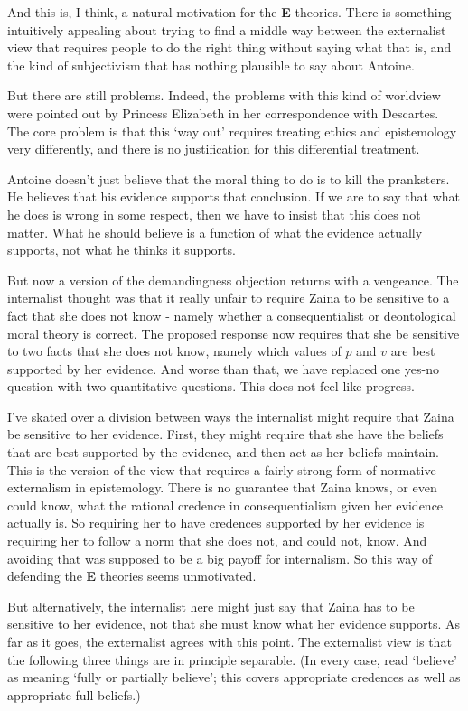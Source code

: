 And this is, I think, a natural motivation for the \textbf{E} theories. There is something intuitively appealing about trying to find a middle way between the externalist view that requires people to do the right thing without saying what that is, and the kind of subjectivism that has nothing plausible to say about \gls{Antoine}.

But there are still problems. Indeed, the problems with this kind of worldview were pointed out by Princess Elizabeth in her correspondence with Descartes. The core problem is that this `way out' requires treating ethics and epistemology very differently, and there is no justification for this differential treatment.

\gls{Antoine} doesn't just believe that the moral thing to do is to kill the pranksters. He believes that his evidence supports that conclusion. If we are to say that what he does is wrong in some respect, then we have to insist that this does not matter. What he should believe is a function of what the evidence actually supports, not what he thinks it supports.

But now a version of the demandingness objection returns with a vengeance. The internalist thought was that it really unfair to require \gls{Zaina} to be sensitive to a fact that she does not know - namely whether a consequentialist or deontological moral theory is correct. The proposed response now requires that she be sensitive to two facts that she does not know, namely which values of $p$ and $v$ are best supported by her evidence. And worse than that, we have replaced one yes-no question with two quantitative questions. This does not feel like progress.

I've skated over a division between ways the internalist might require that \gls{Zaina} be sensitive to her evidence. First, they might require that she have the beliefs that are best supported by the evidence, and then act as her beliefs maintain. This is the version of the view that requires a fairly strong form of normative externalism in epistemology. There is no guarantee that \gls{Zaina} knows, or even could know, what the rational credence in consequentialism given her evidence actually is. So requiring her to have credences supported by her evidence is requiring her to follow a norm that she does not, and could not, know. And avoiding that was supposed to be a big payoff for internalism. So this way of defending the \textbf{E} theories seems unmotivated.

But alternatively, the internalist here might just say that \gls{Zaina} has to be sensitive to her evidence, not that she must know what her evidence supports. As far as it goes, the externalist agrees with this point. The externalist view is that the following three things are in principle separable. (In every case, read `believe' as meaning `fully or partially believe'; this covers appropriate credences as well as appropriate full beliefs.)

